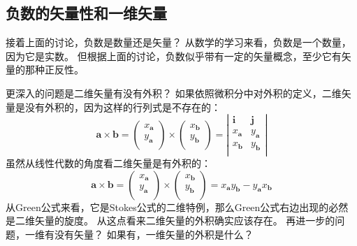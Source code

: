 \subsection{负数的矢量性和一维矢量}

接着上面的讨论，负数是数量还是矢量？
从数学的学习来看，负数是一个数量，因为它是实数。
但根据上面的讨论，负数似乎带有一定的矢量概念，至少它有矢量的那种正反性。

更深入的问题是二维矢量有没有外积？
如果依照微积分中对外积的定义，二维矢量是没有外积的，因为这样的行列式是不存在的：
\[
\boldsymbol{a}\times \boldsymbol{b}=\left( \begin{array}{c}
	x_{\boldsymbol{a}}\\
	y_{\boldsymbol{a}}\\
\end{array} \right) \times \left( \begin{array}{c}
	x_{\boldsymbol{b}}\\
	y_{\boldsymbol{b}}\\
\end{array} \right) =\left| \begin{matrix}
	\mathbf{i}&		\mathbf{j}\\
	x_{\boldsymbol{a}}&		y_{\boldsymbol{a}}\\
	x_{\boldsymbol{b}}&		y_{\boldsymbol{b}}\\
\end{matrix} \right|
\]
虽然从线性代数的角度看二维矢量是有外积的：
\[
\boldsymbol{a}\times \boldsymbol{b}=\left( \begin{array}{c}
	x_{\boldsymbol{a}}\\
	y_{\boldsymbol{a}}\\
\end{array} \right) \times \left( \begin{array}{c}
	x_{\boldsymbol{b}}\\
	y_{\boldsymbol{b}}\\
\end{array} \right) =x_{\boldsymbol{a}}y_{\boldsymbol{b}}-y_{\boldsymbol{a}}x_{\boldsymbol{b}}
\]
从Green公式来看，它是Stokes公式的二维特例，那么Green公式右边出现的必然是二维矢量的旋度。
从这点看来二维矢量的外积确实应该存在。
再进一步的问题，一维有没有矢量？
如果有，一维矢量的外积是什么？

